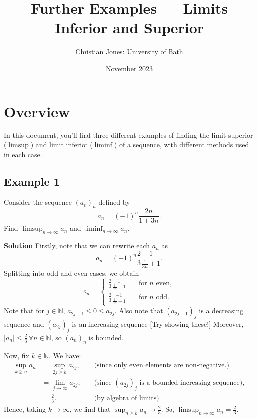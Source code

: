 \documentclass[
  12pt,
  a4paper]{extarticle}
\title{Further Examples --- Limits Inferior and Superior}
\author{Christian Jones: University of Bath}
\date{November 2023}
\theoremstyle{plain}
\theoremstyle{definition}
\theoremstyle{plain}
\theoremstyle{plain}
\theoremstyle{plain}
\theoremstyle{plain}
\theoremstyle{definition}
\theoremstyle{definition}
\theoremstyle{remark}
\theoremstyle{remark}
\let\BeginKnitrBlock\begin \let\EndKnitrBlock\end
\renewcommand{\;}{\,}
\begin{document}
\maketitle

{
\setcounter{tocdepth}{2}
\tableofcontents
}
\newpage
{}

\hypertarget{overview}{%
\section*{Overview}\label{overview}}

In this document, you'll find three different examples of finding the limit superior (\(\limsup\)) and limit inferior (\(\liminf\)) of a sequence, with different methods used in each case.

\hypertarget{example-1}{%
\subsection*{Example 1}\label{example-1}}

\BeginKnitrBlock{example}
{\label{exm:ex1} }Consider the sequence \((a_n)_{n}\) defined by \[a_n = (-1)^n\frac{2n}{1+3n}.\] Find \(\limsup_{n \to \infty} a_n\) and \(\liminf_{n \to \infty} a_n\).
\EndKnitrBlock{example}

\textbf{Solution}
Firstly, note that we can rewrite each \(a_n\) as \[a_n = (-1)^n \frac{2}{3}\frac{1}{\frac{1}{3n} + 1}.\] Splitting into odd and even cases, we obtain \[a_n = \begin{cases} \frac{2}{3}\frac{1}{\frac{1}{3n} + 1} &\quad \text{for $n$ even},\\
\frac{2}{3}\frac{-1}{\frac{1}{3n} + 1} &\quad \text{for $n$ odd}.\end{cases}\] Note that for \(j \in \mathbb{N}\), \(a_{2j-1} \leq 0 \leq a_{2j}\). Also note that \((a_{2j-1})_j\) is a decreasing sequence and \((a_{2j})_{j}\) is an increasing sequence {[}Try showing these!{]} Moreover, \(\lvert a_n \rvert \leq \frac{2}{3} \; \forall n\in\mathbb{N}\), so \((a_n)_n\) is bounded.

Now, fix \(k \in \mathbb{N}\). We have:
\begin{align*}
\sup_{k\geq n}a_n &= \sup_{2j \geq k} a_{2j}, \; \; &&\text{(since only even elements are non-negative.)}\\
&= \lim_{j \to \infty} a_{2j}, \; \; &&\text{(since $(a_{2j})_j$ is a bounded increasing sequence)},\\
&= \frac{2}{3}. \; \; \quad &&\text{(by algebra of limits)}
\end{align*}
Hence, taking \(k \to \infty\), we find that \(\sup_{n \geq k} a_n \to \frac{2}{3}\). So, \(\limsup_{n \to \infty} a_n = \frac{2}{3}\).
\end{document}
